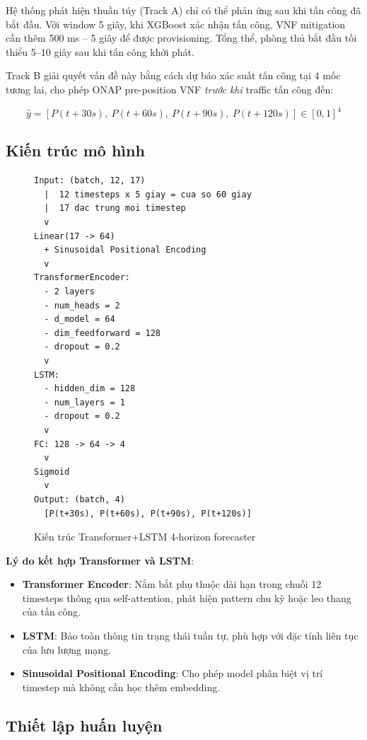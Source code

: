 \documentclass[12pt,a4paper]{article}
\begin{document}
Hệ thống phát hiện thuần túy (Track A) chỉ có thể phản ứng sau khi tấn công đã bắt đầu. Với window 5 giây, khi XGBoost xác nhận tấn công, VNF mitigation cần thêm 500 ms -- 5 giây để được provisioning. Tổng thể, phòng thủ bắt đầu tối thiểu 5--10 giây sau khi tấn công khởi phát.

Track B giải quyết vấn đề này bằng cách dự báo xác suất tấn công tại 4 mốc tương lai, cho phép ONAP pre-position VNF \textit{trước khi} traffic tấn công đến:

\[
\hat{y} = [P(t+30s),\ P(t+60s),\ P(t+90s),\ P(t+120s)] \in [0,1]^4
\]

\subsection{Kiến trúc mô hình}

\begin{figure}[H]
\centering
\begin{lstlisting}
Input: (batch, 12, 17)
  |  12 timesteps x 5 giay = cua so 60 giay
  |  17 dac trung moi timestep
  v
Linear(17 -> 64)
  + Sinusoidal Positional Encoding
  v
TransformerEncoder:
  - 2 layers
  - num_heads = 2
  - d_model = 64
  - dim_feedforward = 128
  - dropout = 0.2
  v
LSTM:
  - hidden_dim = 128
  - num_layers = 1
  - dropout = 0.2
  v
FC: 128 -> 64 -> 4
  v
Sigmoid
  v
Output: (batch, 4)
  [P(t+30s), P(t+60s), P(t+90s), P(t+120s)]
\end{lstlisting}
\caption{Kiến trúc Transformer+LSTM 4-horizon forecaster}
\label{fig:tf_arch}
\end{figure}

\textbf{Lý do kết hợp Transformer và LSTM}:
\begin{itemize}[leftmargin=2em]
\item \textbf{Transformer Encoder}: Nắm bắt phụ thuộc dài hạn trong chuỗi 12 timesteps thông qua self-attention, phát hiện pattern chu kỳ hoặc leo thang của tấn công.
\item \textbf{LSTM}: Bảo toàn thông tin trạng thái tuần tự, phù hợp với đặc tính liên tục của lưu lượng mạng.
\item \textbf{Sinusoidal Positional Encoding}: Cho phép model phân biệt vị trí timestep mà không cần học thêm embedding.
\end{itemize}

\subsection{Thiết lập huấn luyện}
\end{document}
